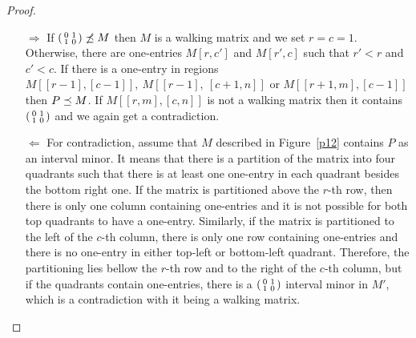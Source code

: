 \begin{proof}
\begin{itemize}
\item[$\Rightarrow$] If $\left(\begin{smallmatrix}0&1\\1&0\end{smallmatrix}\right)\not\preceq M$ then $M$ is a walking matrix and we set $r=c=1$. Otherwise, there are one-entries $M[r,c']$ and $M[r',c]$ such that $r'<r$ and $c'<c$. If there is a one-entry in regions $M[[r-1],[c-1]],\ M[[r-1],\ [c+1,n]]$ or $M[[r+1,m],[c-1]]$ then $P\preceq M$. If $M[[r,m],[c,n]]$ is not a walking matrix then it contains $\left(\begin{smallmatrix}0&1\\1&0\end{smallmatrix}\right)$ and we again get a contradiction.
\item[$\Leftarrow$] For contradiction, assume that $M$ described in Figure~\ref{p12} contains $P$ as an interval minor. It means that there is a partition of the matrix into four quadrants such that there is at least one one-entry in each quadrant besides the bottom right one. If the matrix is partitioned above the $r$-th row, then there is only one column containing one-entries and it is not possible for both top quadrants to have a one-entry. Similarly, if the matrix is partitioned to the left of the $c$-th column, there is only one row containing one-entries and there is no one-entry in either top-left or bottom-left quadrant. Therefore, the partitioning lies bellow the $r$-th row and to the right of the $c$-th column, but if the quadrants contain one-entries, there is a $\left(\begin{smallmatrix}0&1\\1&0\end{smallmatrix}\right)$ interval minor in $M'$, which is a contradiction with it being a walking matrix. %
\end{itemize}
\end{proof}

